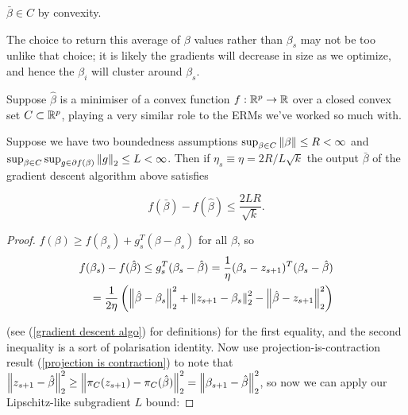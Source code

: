 \documentclass[11pt]{scrartcl}
\begin{document}
\begin{remark}$\bar{\beta} \in C$ by convexity.
\end{remark} %

\begin{remark}The choice to return this average of $\beta$ values rather than $\beta_s$ may not be too unlike that choice; it is likely the gradients will decrease in size as we optimize, and hence the $\beta_i$ will cluster around $\beta_s$.\end{remark}

\begin{theorem}
\label{maths with gradient descent algo}
Suppose $\hat{\beta}$ is a minimiser of a convex function $f:\mathbb R^p \rightarrow \mathbb R$ over a closed convex set $C \subset \mathbb R^p$, playing a very similar role to the ERMs we've worked so much with. 

Suppose we have two boundedness assumptions $\sup_{\beta \in C} \left\lVert\beta\right\rVert \le R < \infty$ and $\sup_{\beta \in C} \sup_{g \in \partial f(\beta)} \left\lVert g\right\rVert_2 \le L < \infty$. Then if $\eta_s \equiv \eta = 2R / L\sqrt{k}$ the output $\bar{\beta}$ of the gradient descent algorithm above satisfies

\begin{equation}
    f(\bar{\beta}) - f(\hat{\beta}) \le \frac{2LR}{\sqrt{k}}.
\label{our classic bounding thing for grad descent algo}
\end{equation}

\begin{proof}
$f(\beta) \ge f(\beta_s) + g_s^T(\beta-\beta_s)$ for all $\beta$, so 
\begin{align}
f(\beta_s) - f(\hat{\beta}) \le g_s^T (\beta_s - \hat{\beta}) = \frac{1}{\eta} (\beta_s - z_{s+1})^T (\beta_s - \hat{\beta}) \\
= \frac{1}{2\eta} \left (\left\lVert\hat{\beta} - \beta_s\right\rVert_2^2 + \left\lVert z_{s+1}-\beta_s\right\rVert_2^2 - \left\lVert\hat{\beta} - z_{s+1}\right\rVert_2^2 \right) \\
\end{align}

(see (\ref{gradient descent algo}) for definitions) for the first equality, and the second inequality is a sort of polarisation identity. Now use projection-is-contraction result (\ref{projection is contraction}) to note that $\left\lVert z_{s+1} - \hat{\beta}\right\rVert_2^2 \ge \left\lVert\pi_C(z_{s+1}) - \pi_C( \hat{ \beta })\right\rVert_2^2  = \left\lVert\beta_{s+1} - \hat{\beta}\right\rVert_2^2$, so now we can apply our Lipschitz-like subgradient $L$ bound:


\end{proof}
\end{theorem}
\end{document}
